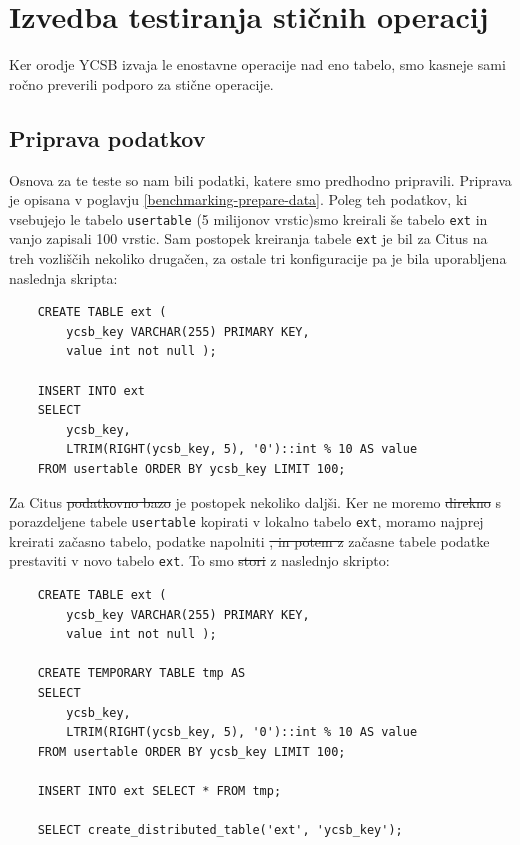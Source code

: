 \documentclass[a4paper, 12pt]{book}
\providecommand{\DIFaddtex}[1]{{\protect\color{blue}\uwave{#1}}} %
\providecommand{\DIFdeltex}[1]{{\protect\color{red}\sout{#1}}}                      %
\providecommand{\DIFaddbegin}{} %
\providecommand{\DIFaddend}{} %
\providecommand{\DIFdelbegin}{} %
\providecommand{\DIFdelend}{} %
\providecommand{\DIFadd}[1]{\texorpdfstring{\DIFaddtex{#1}}{#1}} %
\providecommand{\DIFdel}[1]{\texorpdfstring{\DIFdeltex{#1}}{}} %
\newcommand{\DIFscaledelfig}{0.5}
\newlength{\DIFdelgraphicswidth} %
\newlength{\DIFdelgraphicsheight} %
\newcommand{\DIFaddincludegraphics}[2][]{{\color{blue}\fbox{\DIFOincludegraphics[#1]{#2}}}} %
\newcommand{\DIFdelincludegraphics}[2][]{%
\sbox{\DIFdelgraphicsbox}{\DIFOincludegraphics[#1]{#2}}%
\settoboxwidth{\DIFdelgraphicswidth}{\DIFdelgraphicsbox} %
\settoboxtotalheight{\DIFdelgraphicsheight}{\DIFdelgraphicsbox} %
\scalebox{\DIFscaledelfig}{%
\parbox[b]{\DIFdelgraphicswidth}{\usebox{\DIFdelgraphicsbox}\\[-\baselineskip] \rule{\DIFdelgraphicswidth}{0em}}\llap{\resizebox{\DIFdelgraphicswidth}{\DIFdelgraphicsheight}{%
\setlength{\unitlength}{\DIFdelgraphicswidth}%
\begin{picture}(1,1)%
\thicklines\linethickness{2pt} %
{\color[rgb]{1,0,0}\put(0,0){\framebox(1,1){}}}%
{\color[rgb]{1,0,0}\put(0,0){\line( 1,1){1}}}%
{\color[rgb]{1,0,0}\put(0,1){\line(1,-1){1}}}%
\end{picture}%
}\hspace*{3pt}}} %
} %
\DeclareRobustCommand{\DIFaddbegin}{\DIFOaddbegin \let\includegraphics\DIFaddincludegraphics} %
\DeclareRobustCommand{\DIFaddend}{\DIFOaddend \let\includegraphics\DIFOincludegraphics} %
\DeclareRobustCommand{\DIFdelbegin}{\DIFOdelbegin \let\includegraphics\DIFdelincludegraphics} %
\DeclareRobustCommand{\DIFdelend}{\DIFOaddend \let\includegraphics\DIFOincludegraphics} %
\begin{document}
\newpage
\section{Izvedba testiranja stičnih operacij}
Ker orodje YCSB izvaja le enostavne operacije nad eno tabelo, smo kasneje sami ročno preverili podporo za stične operacije.

\subsection{Priprava podatkov}
Osnova za te teste so nam bili podatki, katere smo predhodno pripravili. Priprava je opisana v poglavju \ref{benchmarking-prepare-data}. Poleg teh podatkov, ki vsebujejo le tabelo \texttt{usertable} (5 milijonov vrstic)\DIFaddbegin \DIFadd{, }\DIFaddend smo kreirali še tabelo \texttt{ext} in vanjo zapisali 100 vrstic. Sam postopek kreiranja tabele \texttt{ext} je bil za Citus na treh vozliščih nekoliko drugačen, za ostale tri konfiguracije pa je bila uporabljena naslednja skripta:

\begin{listing}[H]
\begin{verbatim}
    CREATE TABLE ext (
        ycsb_key VARCHAR(255) PRIMARY KEY,
        value int not null );

    INSERT INTO ext
    SELECT
        ycsb_key,
        LTRIM(RIGHT(ycsb_key, 5), '0')::int % 10 AS value
    FROM usertable ORDER BY ycsb_key LIMIT 100;
\end{verbatim}
\label{benchmarking_joins_data}
\end{listing}

Za Citus \DIFdelbegin \DIFdel{podatkovno bazo }\DIFdelend je postopek nekoliko daljši. Ker ne moremo \DIFdelbegin \DIFdel{direkno }\DIFdelend \DIFaddbegin \DIFadd{neposredno }\DIFaddend s porazdeljene tabele \texttt{usertable} kopirati v lokalno tabelo \texttt{ext}, moramo najprej kreirati začasno tabelo, podatke napolniti \DIFdelbegin \DIFdel{, in potem z }\DIFdelend \DIFaddbegin \DIFadd{in potem iz }\DIFaddend začasne tabele podatke prestaviti v novo tabelo \texttt{ext}. To smo \DIFdelbegin \DIFdel{stori }\DIFdelend \DIFaddbegin \DIFadd{storili }\DIFaddend z naslednjo skripto:

\begin{listing}[H]
\begin{verbatim}
    CREATE TABLE ext (
        ycsb_key VARCHAR(255) PRIMARY KEY,
        value int not null );

    CREATE TEMPORARY TABLE tmp AS
    SELECT
        ycsb_key,
        LTRIM(RIGHT(ycsb_key, 5), '0')::int % 10 AS value
    FROM usertable ORDER BY ycsb_key LIMIT 100;

    INSERT INTO ext SELECT * FROM tmp;

    SELECT create_distributed_table('ext', 'ycsb_key');
\end{verbatim}
\label{benchmarking_joins_citus_data}
\end{listing}
\end{document}
